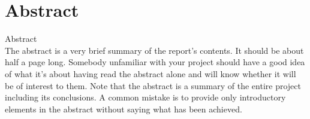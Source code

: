 \documentclass[12pt,twoside]{article}
\begin{document}



\section{Abstract}
Abstract\\
The abstract is a very brief summary of the report's contents. It should be about half a page long. Somebody unfamiliar with your project should have a good idea of what it's about having read the abstract alone and will know whether it will be of interest to them. Note that the abstract is a summary of the entire project including its conclusions. A common mistake is to provide only introductory elements in the abstract without saying what has been achieved.\\
\end{document}
